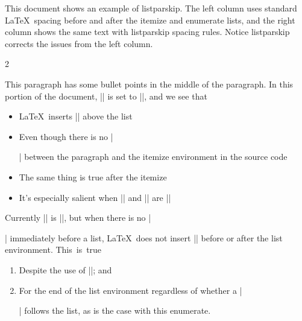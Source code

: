 \documentclass[12pt]{article}
\begin{document}
\def\documentname{Example}

\newdimen\MacroIndent

\baselineskip=14pt

This document shows an example of \textsf{listparskip}. The left column uses standard \LaTeX\ spacing before and after the itemize and enumerate lists, and the right column shows the same text with \textsf{listparskip} spacing rules. Notice \textsf{listparskip} corrects the issues from the left column.
\begin{multicols*}{2}
\parskip\bigskipamount

\lipsum[1][1]

This paragraph has some bullet points in the middle of the paragraph. In this portion of the document, |\parskip| is set to |\bigskipamount|, and we see that
\begin{itemize}
\item \LaTeX\ inserts |\parskip| above the list
\item Even though there is no |\par| between the paragraph and the itemize environment in the source code
\item The same thing is true after the itemize
\item It's especially salient when |\topsep| and |\itemsep| are |\smallskipamount|
\end{itemize}
Currently |\partopsep| is |\medskipamount|, but when there is no |\par| immediately before a list, \LaTeX\ does not insert |\partopsep| before or after the list environment. \hbox{This is true}
\begin{enumerate}
\item Despite the use of |\parskip|; and
\item For the end of the list environment regardless of whether a |\par| follows the list, as is the case with this enumerate.
\end{enumerate}

\lipsum[1][2]

\vfill\nointerlineskip\null
\columnbreak

\lipsum[1][1]


\end{multicols*}
\end{document}
